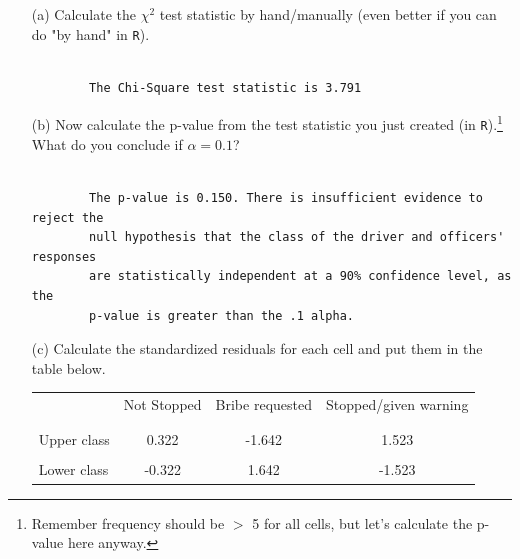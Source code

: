 \documentclass[12pt,letterpaper]{article}
\begin{document}
\begin{enumerate}
	
	\item [(a)]
	Calculate the $\chi^2$ test statistic by hand/manually (even better if you can do "by hand" in \texttt{R}).\\
	
	\begin{verbatim}
		
		The Chi-Square test statistic is 3.791
	\end{verbatim}
	
	
	\vspace{3cm}

	
	\item [(b)]
	Now calculate the p-value from the test statistic you just created (in \texttt{R}).\footnote{Remember frequency should be $>$ 5 for all cells, but let's calculate the p-value here anyway.}  What do you conclude if $\alpha = 0.1$?\\
	
		\begin{verbatim}
		
		The p-value is 0.150. There is insufficient evidence to reject the 
		null hypothesis that the class of the driver and officers' responses 
		are statistically independent at a 90% confidence level, as the 
		p-value is greater than the .1 alpha. 
	\end{verbatim}
	
	
	
	\vspace{2cm}
	\item [(c)] Calculate the standardized residuals for each cell and put them in the table below.
	\vspace{1cm}
	
	\begin{table}[h]
		\centering
		\begin{tabular}{l | c c c }
			& Not Stopped & Bribe requested & Stopped/given warning \\
			\\[-1.8ex] 
			\hline \\[-1.8ex]
			Upper class  &  0.322&-1.642  & 1.523 \\
			\\
			Lower class &  -0.322& 1.642  & -1.523  \\
			
		\end{tabular}
	\end{table}
		
	

\end{enumerate}
\end{document}
